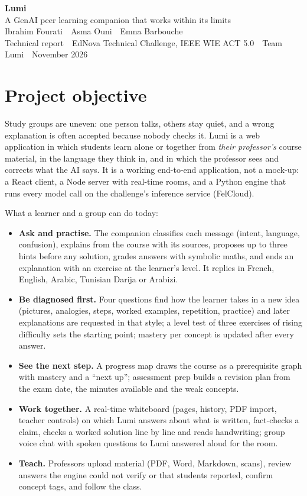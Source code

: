 \documentclass[11pt,a4paper]{article}
\begin{document}
\begin{center}
{\sffamily\bfseries\LARGE\color{iris} Lumi}\\[2pt]
{\sffamily\large A GenAI peer learning companion that works within its limits}\\[4pt]
{\sffamily Ibrahim Fourati \,\textbullet\, Asma Ouni \,\textbullet\, Emna Barbouche}\\[3pt]
{\small\color{slate} Technical report \,\textbullet\, EdNova Technical Challenge, IEEE WIE ACT 5.0 \,\textbullet\, Team Lumi \,\textbullet\, November 2026}
\end{center}
\vspace{-4pt}

\section{Project objective}

Study groups are uneven: one person talks, others stay quiet, and a wrong explanation is often accepted because nobody
checks it. Lumi is a web application in which students learn alone or together from \emph{their professor's} course
material, in the language they think in, and in which the professor sees and corrects what the AI says. It is a
working end-to-end application, not a mock-up: a React client, a Node server with real-time rooms, and a Python
engine that runs every model call on the challenge's inference service (FelCloud).

What a learner and a group can do today:

\begin{itemize}
\item \textbf{Ask and practise.} The companion classifies each message (intent, language, confusion), explains from
the course with its sources, proposes up to three hints before any solution, grades answers with symbolic maths, and
ends an explanation with an exercise at the learner's level. It replies in French, English, Arabic, Tunisian Darija
or Arabizi.
\item \textbf{Be diagnosed first.} Four questions find how the learner takes in a new idea (pictures, analogies,
steps, worked examples, repetition, practice) and later explanations are requested in that style; a level test of
three exercises of rising difficulty sets the starting point; mastery per concept is updated after every answer.
\item \textbf{See the next step.} A progress map draws the course as a prerequisite graph with mastery and a
``next up''; assessment prep builds a revision plan from the exam date, the minutes available and the weak concepts.
\item \textbf{Work together.} A real-time whiteboard (pages, history, PDF import, teacher controls) on which Lumi
answers about what is written, fact-checks a claim, checks a worked solution line by line and reads handwriting;
group voice chat with spoken questions to Lumi answered aloud for the room.
\item \textbf{Teach.} Professors upload material (PDF, Word, Markdown, scans), review answers the engine could not
verify or that students reported, confirm concept tags, and follow the class.
\end{itemize}
\end{document}
